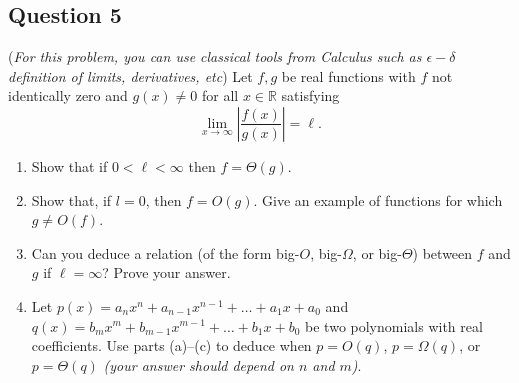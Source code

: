 \documentclass{article}
\begin{document}
\subsection*{Question 5}
    (\textit{For this problem, you can use classical tools from Calculus such as $\epsilon-\delta$ definition of limits, derivatives, etc}) Let $f, g$ be real functions with $f$ not identically zero and $g(x) \ne 0$ for all $x \in \mathbb{R}$ satisfying $$\lim_{x \rightarrow \infty} \left|\frac{f(x)}{g(x)}\right| = \ell.$$
    \begin{enumerate}
        \item Show that if $0 < \ell < \infty$ then $f = \Theta(g)$.
        \item Show that, if $l = 0$, then $f = O(g)$. Give an example of functions for which $g \ne O(f)$.
        \item Can you deduce a relation (of the form big-$O$, big-$\Omega$, or big-$\Theta$) between $f$ and $g$ if $\ell = \infty$? Prove your answer.
        \item Let $p(x) = a_{n}x^{n} + a_{n - 1}x^{n - 1} + \dots + a_{1}x + a_{0}$ and $q(x) = b_{m}x^{m} + b_{m - 1}x^{m - 1} + \dots + b_{1}x + b_{0}$ be two polynomials with real coefficients. Use parts (a)--(c) to deduce when $p = O(q)$, $p = \Omega(q)$, or $p = \Theta(q)$ \textit{(your answer should depend on $n$ and $m$)}.
    \end{enumerate}
\end{document}
